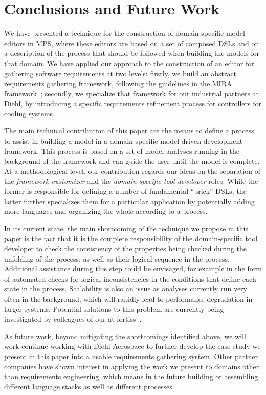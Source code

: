 \section{Conclusions and Future Work}
\label{sec:conclusion}
 \vspace{-.4cm}
We have presented a technique for the construction of
domain-specific model editors in MPS, where these editors are based on
a set of composed DSLs and on a description of the process that
should be followed when building the models for that domain. We have applied our
approach to the construction of an editor for gathering software requirements
at two levels: firstly, we build an abstract requirements gathering framework,
following the guidelines in the MIRA framework~\cite{MIRA13}; secondly, we
specialize that framework for our industrial partners at Diehl, by introducing
a specific requirements refinement process for controllers for cooling systems.

The main technical contribution of this paper are the means to define a process
to assist in building a model in a domain-specific model-driven development
framework. This process is based on a set of model analyses running in the
background of the framework and can guide the user until the model is complete.
At a methodological level, our contribution regards our ideas on the separation
of the \emph{framework customizer} and the  \emph{domain specific tool
developer} roles. While the former is responsible for defining a number of
fundamental ``brick'' DSLs, the latter further specializes them for a particular
application by potentially adding more languages and organizing the whole
according to a process.

In its current state, the main shortcoming of the technique we propose in this
paper is the fact that it is the complete responsibility of the domain-specific
tool developer to check the consistency of the properties being checked during
the unfolding of the process, as well as their logical sequence in the process.
Additional assistance during this step could be envisaged, for example in the
form of automated checks for logical inconsistencies in the conditions that
define each state in the process. Scalability is also an issue as analyses
currently run very often in the background, which will rapidly lead to
performance degradation in larger systems. Potential solutions to this problem
are currently being investigated by colleagues of our at
fortiss~\cite{Models17Sudeep}.

As future work, beyond mitigating the shortcomings identified above, we will
work continue working with Diehl Aerospace to further develop the case study we
present in this paper into a usable requirements gathering system. Other partner companies
have shown interest in applying the work we present to domains other than
requirements engineering, which means in the future building or assembling
different language stacks as well as different processes.
 \vspace{-.6cm}
